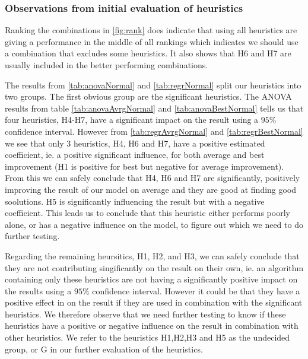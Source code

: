 \documentclass[../main.tex]{subfiles}
\begin{document}
\subsubsection{Observations from initial evaluation of heuristics}
Ranking the combinations in \cref{fig:rank} does indicate that using all heuristics are giving a performance in the middle of all rankings which indicates we should use a combination that excludes some heuristics. 
It also shows that H6 and H7 are usually included in the better performing combinations. \par 
The results from \cref{tab:anovaNormal} and \cref{tab:regrNormal} split our heuristics into two groups. 
The first obvious group are the significant heuristics.
The ANOVA results from table \cref{tab:anovaAvrgNormal} and \cref{tab:anovaBestNormal} tells us that four heuristics, H4-H7, have a significant impact on the result using a $95\%$ confidence interval.
However from \cref{tab:regrAvrgNormal} and \cref{tab:regrBestNormal} we see that only 3 heuristics, H4, H6 and H7, have a positive estimated coefficient, ie. a positive significant influence, for both average and best improvement (H1 is positive for best but negative for average improvement).
From this we can safely conclude that H4, H6 and H7 are significantly, positively improving the result of our model on average and they are good at finding good soolutions. 
H5 is significantly influencing the result but with a negative coefficient. 
This leads us to conclude that this heuristic either performs poorly alone, or has a negative influence on the model, to figure out which we need to do further testing.
\par
Regarding the remaining heursitics, H1, H2, and H3, we can safely conclude that they are not contributing singificantly on the result on their own, ie. an algorithm containing only these heuristics are not having a significantly positive impact on the results using a $95\%$ confidence interval.
However it could be that they have a positive effect in on the result if they are used in combination with the significant heuristics.
We therefore observe that we need further testing to know if these heuristics have a positive or negative influence on the result in combination with other heuristics.
We refer to the heuristics H1,H2,H3 and H5 as the undecided group, or G in our further evaluation of the heuristics.
\end{document}
